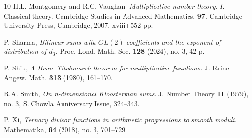 \documentclass[11pt,reqno]{amsart}
\numberwithin{equation}{section}
\theoremstyle{plain}
\theoremstyle{definition}
\begin{document}
\begin{thebibliography}{10}
H.L. Montgomery and R.C. Vaughan, {\it Multiplicative number theory. I.} Classical theory.
Cambridge Studies in Advanced Mathematics, \textbf{97}. Cambridge University Press, Cambridge, 2007. xviii+552 pp.


P. Sharma, \textit{Bilinear sums with $GL(2)$ coefficients and the exponent of distribution of $d_3$.}
Proc. Lond. Math. Soc. \textbf{128} (2024), no. 3, 42 p.

P. Shiu, \textit{A Brun--Titchmarsh theorem for multiplicative functions.} J. Reine Angew. Math. \textbf{313} (1980), 161--170.

R.A. Smith, {\it On n-dimensional Kloosterman sums}. J. Number Theory \textbf{11} (1979), no. 3, S. Chowla Anniversary Issue, 324--343.

P. Xi, {\it Ternary divisor functions in arithmetic progressions to smooth moduli.} Mathematika, \textbf{64} (2018), no. 3, 701--729.

\end{thebibliography}
\end{document}
